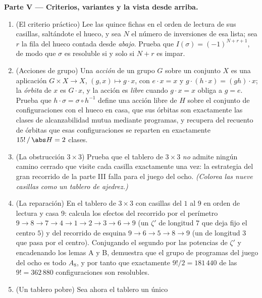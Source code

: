 \begin{problem}
\medskip
\noindent\textbf{Parte V --- Criterios, variantes y la vista desde
arriba.}
\begin{enumerate}[resume]
  \item (El criterio práctico) Lee las quince fichas en el orden
        de lectura de sus casillas, saltándote el hueco, y sea $N$
        el número de inversiones de esa lista; sea $r$ la fila del
        hueco contada desde \emph{abajo}. Prueba que $I(\sigma) =
        (-1)^{N + r + 1}$, de modo que $\sigma$ es resoluble si y
        solo si $N + r$ es impar.
  \item (Acciones de grupo) Una \emph{acción} de un grupo $G$
        sobre un conjunto $X$ es una aplicación $G \times X \to
        X$, $(g, x) \mapsto g \cdot x$, con $e \cdot x = x$ y $g
        \cdot (h \cdot x) = (gh) \cdot x$; la \emph{órbita} de $x$
        es $G \cdot x$, y la acción es \emph{libre} cuando $g
        \cdot x = x$ obliga a $g = e$. Prueba que $h \cdot \sigma
        = \sigma \circ h^{-1}$ define una acción libre de $H$
        sobre el conjunto de configuraciones con el hueco en casa,
        que sus órbitas son exactamente las clases de
        alcanzabilidad mutua mediante programas, y recupera del
        recuento de órbitas que esas configuraciones se reparten
        en exactamente $15!\,/\,\abs H = 2$ clases.
  \item (La obstrucción $3 \times 3$) Prueba que el tablero de $3
        \times 3$ \emph{no} admite ningún camino cerrado que visite
        cada casilla exactamente una vez: la estrategia del gran
        recorrido de la parte III falla para el juego del ocho.
        \emph{(Colorea las nueve casillas como un tablero de
        ajedrez.)}
  \item (La reparación) En el tablero de $3 \times 3$ con casillas
        del $1$ al $9$ en orden de lectura y casa $9$: calcula los
        efectos del recorrido por el perímetro $9 \to 8 \to 7 \to
        4 \to 1 \to 2 \to 3 \to 6 \to 9$ (un  $\zeta'$ de
        longitud $7$ que deja fijo el centro $5$) y del recorrido
        de esquina $9 \to 6 \to 5 \to 8 \to 9$ (un  de
        longitud $3$ que pasa por el centro). Conjugando el
        segundo por las potencias de $\zeta'$ y encadenando los
        lemas A y B, demuestra que el grupo de programas del juego
        del ocho es todo $A_8$, y por tanto que exactamente $9!/2
        = 181\,440$ de las $9! = 362\,880$ configuraciones son
        resolubles.
  \item (Un tablero pobre) Sea ahora el tablero un único

\end{enumerate}
\end{problem}
